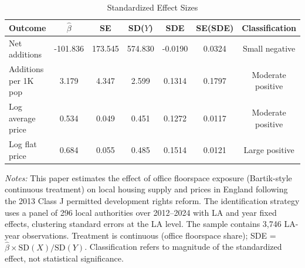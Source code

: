 \begin{table}[htbp]
\centering
\caption{Standardized Effect Sizes}
\label{tab:sde}
\footnotesize\begin{tabular}{lcccccc}
\hline\hline
Outcome & $\hat{\beta}$ & SE & SD($Y$) & SDE & SE(SDE) & Classification \\
\hline
Net additions & -101.836 & 173.545 & 574.830 & -0.0190 & 0.0324 & Small negative \\
Additions per 1K pop & 3.179 & 4.347 & 2.599 & 0.1314 & 0.1797 & Moderate positive \\
Log average price & 0.534 & 0.049 & 0.451 & 0.1272 & 0.0117 & Moderate positive \\
Log flat price & 0.684 & 0.055 & 0.485 & 0.1514 & 0.0121 & Large positive \\
\hline\hline
\end{tabular}
\begin{minipage}{0.95\textwidth}
\vspace{0.3em}
\footnotesize
\textit{Notes:} This paper estimates the effect of office floorspace exposure (Bartik-style continuous treatment) on local housing supply and prices in England following the 2013 Class J permitted development rights reform. The identification strategy uses a panel of 296 local authorities over 2012--2024 with LA and year fixed effects, clustering standard errors at the LA level. The sample contains 3,746 LA-year observations. Treatment is continuous (office floorspace share); SDE = $\hat{\beta} \times \text{SD}(X) / \text{SD}(Y)$. Classification refers to magnitude of the standardized effect, not statistical significance.
\end{minipage}
\end{table}
